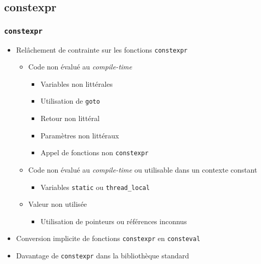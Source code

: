 \documentclass[C++.tex]{subfiles}
\begin{document}
\subsection*{constexpr}
\begin{frame}[fragile]
	\frametitle{\lstinline|constexpr|}
	\begin{itemize}
		\item Relâchement de contrainte sur les fonctions \lstinline|constexpr|
		\begin{itemize}
			\item Code non évalué au \textit{compile-time}


			\begin{itemize}
				\item Variables non littérales
				\item Utilisation de \lstinline|goto|
				\item Retour non littéral
				\item Paramètres non littéraux
				\item Appel de fonctions non \lstinline|constexpr|
			\end{itemize}
			\item Code non évalué au \textit{compile-time} ou utilisable dans un contexte constant
			\begin{itemize}
				\item Variables \lstinline|static| ou \lstinline|thread_local|

			\end{itemize}
			\item Valeur non utilisée
			\begin{itemize}
				\item Utilisation de pointeurs ou références inconnus

			\end{itemize}
		\end{itemize}
		\item Conversion implicite de fonctions \lstinline|constexpr| en \lstinline|consteval| 


		\item Davantage de \lstinline|constexpr| dans la bibliothèque standard
	\end{itemize}
\end{frame}
\end{document}
